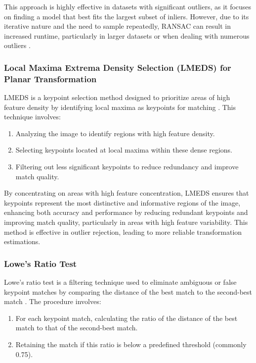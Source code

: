 This approach is highly effective in datasets with significant outliers, as it focuses on finding a model that best fits the largest subset of inliers. However, due to its iterative nature and the need to sample repeatedly, RANSAC can result in increased runtime, particularly in larger datasets or when dealing with numerous outliers \cite{ransac1981random}.

\subsubsection*{Local Maxima Extrema Density Selection (LMEDS) for Planar Transformation}

LMEDS is a keypoint selection method designed to prioritize areas of high feature density by identifying local maxima as keypoints for matching \cite{lmeds2002local}. This technique involves:

\begin{enumerate} 
    \item Analyzing the image to identify regions with high feature density. 
    \item Selecting keypoints located at local maxima within these dense regions. 
    \item Filtering out less significant keypoints to reduce redundancy and improve match quality.
\end{enumerate}

By concentrating on areas with high feature concentration, LMEDS ensures that keypoints represent the most distinctive and informative regions of the image, enhancing both accuracy and performance by reducing redundant keypoints and improving match quality, particularly in areas with high feature variability. This method is effective in outlier rejection, leading to more reliable transformation estimations.

\subsubsection*{Lowe's Ratio Test}

Lowe's ratio test is a filtering technique used to eliminate ambiguous or false keypoint matches by comparing the distance of the best match to the second-best match \cite{lowe2004}. The procedure involves:

\begin{enumerate} 
    \item For each keypoint match, calculating the ratio of the distance of the best match to that of the second-best match. 
    \item Retaining the match if this ratio is below a predefined threshold (commonly 0.75). 
\end{enumerate}

